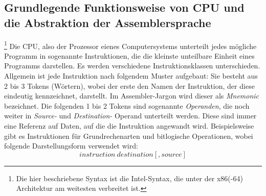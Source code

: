 \documentclass[11pt]{article} %
\begin{document}
\subsection{Grundlegende Funktionsweise von CPU und die Abstraktion der Assemblersprache}\footnote{
		Die hier beschriebene Syntax ist die Intel-Syntax, die unter der x86(-64)
		Architektur am weitesten verbreitet ist.}
Die CPU, also der Prozessor eienes Computersystems unterteilt jedes mögliche Programm in sogenannte
Instruktionen, die die kleinste unteilbare Einheit eines Programms darstellen. Es werden
verschiedene Instruktionsklassen unterschieden. Allgemein ist jede Instruktion nach folgendem Muster
aufgebaut: Sie besteht aus 2 bis 3 Tokens (Wörtern), wobei der erste den Namen der Instruktion, der
diese eindeutig kennzeichnet, darstellt. Im Assembler-Jargon wird dieser als \textit{Mnemonic}
bezeichnet. Die folgenden 1 bis 2 Tokens sind sogenannte \textit{Operanden}, die noch weiter in
\textit{Source-} und \textit{Destination-} Operand unterteilt werden. Diese sind immer
eine Referenz auf Daten, auf die die Instruktion angewandt wird. Beispielsweise gibt es
Instruktionen für Grundrechenarten und bitlogische Operationen, wobei folgende Darstellungsform
verwendet wird: $$ instruction\ destination[, source]$$
\end{document}
